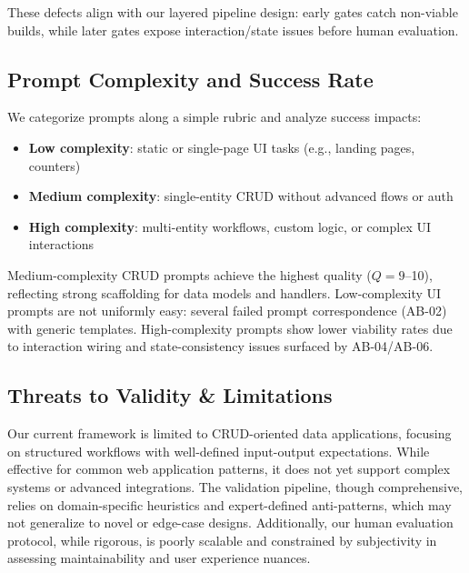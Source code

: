 \documentclass[conference]{IEEEtran}
\begin{document}
These defects align with our layered pipeline design: early gates catch non-viable builds, while later gates expose interaction/state issues before human evaluation.

\subsection{Prompt Complexity and Success Rate}
\label{sec:prompt-complexity}

We categorize prompts along a simple rubric and analyze success impacts:

\begin{itemize}
\item \textbf{Low complexity}: static or single-page UI tasks (e.g., landing pages, counters)
\item \textbf{Medium complexity}: single-entity CRUD without advanced flows or auth
\item \textbf{High complexity}: multi-entity workflows, custom logic, or complex UI interactions
\end{itemize}

Medium-complexity CRUD prompts achieve the highest quality ($Q=9$--10), reflecting strong scaffolding for data models and handlers. Low-complexity UI prompts are not uniformly easy: several failed prompt correspondence (AB-02) with generic templates. High-complexity prompts show lower viability rates due to interaction wiring and state-consistency issues surfaced by AB-04/AB-06.

\subsection{Threats to Validity \& Limitations}
\label{sec:limitations}

Our current framework is limited to CRUD-oriented data applications, focusing on structured workflows with well-defined input-output expectations. While effective for common web application patterns, it does not yet support complex systems or advanced integrations. The validation pipeline, though comprehensive, relies on domain-specific heuristics and expert-defined anti-patterns, which may not generalize to novel or edge-case designs. Additionally, our human evaluation protocol, while rigorous, is poorly scalable and constrained by subjectivity in assessing maintainability and user experience nuances.
\end{document}
